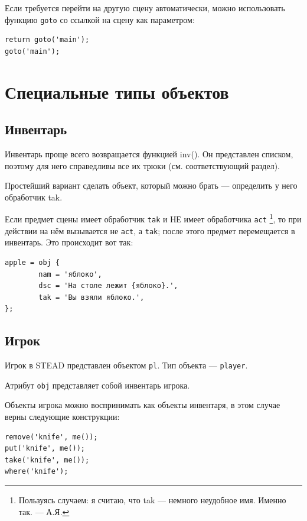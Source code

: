 \documentclass[a4paper,12pt]{article}
\begin{document}
Если требуется перейти на другую сцену автоматически, можно использовать функцию \verb/goto/ со ссылкой на сцену как параметром:

\begin{verbatim}
return goto('main');
goto('main');
\end{verbatim}

\section{Специальные типы объектов}

\subsection{Инвентарь}


Инвентарь проще всего возвращается функцией inv(). Он представлен списком, поэтому для него справедливы все их трюки (см. соответствующий раздел).

Простейший вариант сделать объект, который можно брать --- определить у него обработчик tak.

Если предмет сцены имеет обработчик \verb/tak/ и НЕ имеет обработчика \verb/act/ \footnote{Пользуясь случаем: я считаю, что tak --- немного неудобное имя. Именно так. --- А.Я.}, то при действии на нём вызывается не \verb/act/, а \verb/tak/; после этого предмет перемещается в инвентарь. Это происходит вот так:

\begin{verbatim}
apple = obj {
        nam = 'яблоко',
        dsc = 'На столе лежит {яблоко}.',
        tak = 'Вы взяли яблоко.',
};
\end{verbatim}

\subsection{Игрок}

Игрок в STEAD представлен объектом \verb/pl/. Тип объекта --- \verb/player/.

Атрибут \verb/obj/ представляет собой инвентарь игрока.

Объекты игрока можно воспринимать как объекты инвентаря, в этом случае верны следующие конструкции:

\begin{verbatim}
remove('knife', me());
put('knife', me());
take('knife', me());
where('knife');
\end{verbatim}
\end{document}
